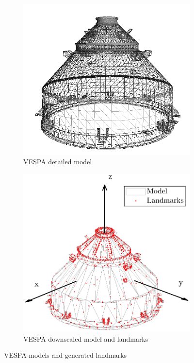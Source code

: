 \begin{figure}
\begin{subfigure}{0.48\linewidth}
    \centering
    \includegraphics[width =0.75\linewidth]{Images/vespina.png}
    \caption{VESPA detailed model}
    \label{fig:vespastl}
    \end{subfigure}
    \begin{subfigure}{0.48\linewidth}
    \centering
    \includegraphics[clip,trim = 4cm 5cm 2.8cm 3.4cm, width =\linewidth]{Images/VESPA9mm.eps}
    \caption{VESPA downscaled model and landmarks}
    \label{fig:vespafeatures}
    \end{subfigure}
    \caption{VESPA models and generated landmarks}
    \label{fig:vestastlfeat}
\end{figure}


